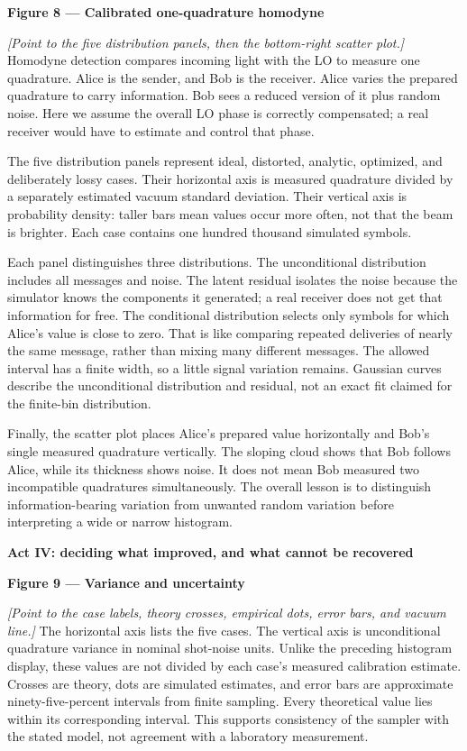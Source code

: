 \documentclass[11pt,letterpaper]{article}
\newcommand{\cue}[1]{\par\textbf{#1}\par}
\newcommand{\stage}[1]{\textit{[#1]}}
\begin{document}
\cue{Figure 8 --- Calibrated one-quadrature homodyne}
\stage{Point to the five distribution panels, then the bottom-right scatter plot.}
Homodyne detection compares incoming light with the LO to measure one quadrature. Alice is the sender, and Bob is the receiver. Alice varies the prepared quadrature to carry information. Bob sees a reduced version of it plus random noise. Here we assume the overall LO phase is correctly compensated; a real receiver would have to estimate and control that phase.

The five distribution panels represent ideal, distorted, analytic, optimized, and deliberately lossy cases. Their horizontal axis is measured quadrature divided by a separately estimated vacuum standard deviation. Their vertical axis is probability density: taller bars mean values occur more often, not that the beam is brighter. Each case contains one hundred thousand simulated symbols.

Each panel distinguishes three distributions. The unconditional distribution includes all messages and noise. The latent residual isolates the noise because the simulator knows the components it generated; a real receiver does not get that information for free. The conditional distribution selects only symbols for which Alice's value is close to zero. That is like comparing repeated deliveries of nearly the same message, rather than mixing many different messages. The allowed interval has a finite width, so a little signal variation remains. Gaussian curves describe the unconditional distribution and residual, not an exact fit claimed for the finite-bin distribution.

Finally, the scatter plot places Alice's prepared value horizontally and Bob's single measured quadrature vertically. The sloping cloud shows that Bob follows Alice, while its thickness shows noise. It does not mean Bob measured two incompatible quadratures simultaneously. The overall lesson is to distinguish information-bearing variation from unwanted random variation before interpreting a wide or narrow histogram.

\newpage
\cue{Act IV: deciding what improved, and what cannot be recovered}
\cue{Figure 9 --- Variance and uncertainty}
\stage{Point to the case labels, theory crosses, empirical dots, error bars, and vacuum line.}
The horizontal axis lists the five cases. The vertical axis is unconditional quadrature variance in nominal shot-noise units. Unlike the preceding histogram display, these values are not divided by each case's measured calibration estimate. Crosses are theory, dots are simulated estimates, and error bars are approximate ninety-five-percent intervals from finite sampling. Every theoretical value lies within its corresponding interval. This supports consistency of the sampler with the stated model, not agreement with a laboratory measurement.
\end{document}
